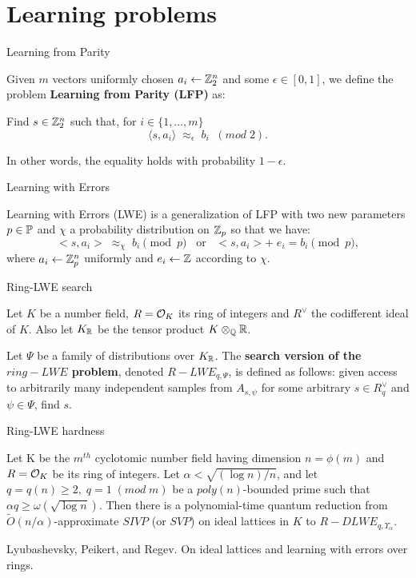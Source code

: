 \documentclass[notheorems, bigger]{beamer}
\begin{document}
\section{Learning problems}
\label{sec:org6cca3bc}
\begin{frame}[label={sec:org454f283}]{Learning from Parity}
\begin{text}
  Given $m$ vectors uniformly chosen  $a_i \gets \Z^n_2$ and some $\epsilon \in [0,1]$, we
  define the problem \textbf{Learning from Parity (LFP)} as:

  Find $s \in \Z^n_2$ such that, for $i \in \{1,\dots,m\}$
  $$ \langle{s, a_i}\rangle \; \approx_\epsilon \; b_i \;\; (mod\; 2). $$

  In other words, the equality holds with probability $1 - \epsilon$.
\end{text}
\end{frame}
\begin{frame}[label={sec:org1acc938}]{Learning with Errors}
\begin{text}
Learning with Errors (LWE) is a generalization of LFP  with two new parameters
$p \in \P$ and $\chi$ a probability distribution on $\Z_p$ so that we have:
\[
  <s, a_i> \; \approx_\chi \; b_i \pmod p \;\;\; \text{or} \;\;\; <s, a_i> + \; e_i =  b_i \pmod p ,
\]
where $a_i \gets \Z^n_p$ uniformly and $e_i \gets \Z$ according to $\chi$.
\end{text}
\end{frame}
\begin{frame}[label={sec:orgc575fd0}]{Ring-LWE search}
\begin{text}
  Let $K$ be a number field, $R = \Ok$ its ring of integers and $R^\vee$ the
  codifferent ideal of $K$. Also let $K_\R$ be the tensor product $K \otimes_\Q \R$.


  Let $\Psi$ be a family of distributions over $K_\R$. The \textbf{search version of the $ring-LWE$ problem}, denoted $R-LWE_{q,\Psi}$, is defined as follows: given access to arbitrarily many independent samples from $A_{s,\psi}$ for some arbitrary $s \in R_q^\vee$ and $\psi \in \Psi$, find $s$.
\end{text}
\end{frame}
\begin{frame}[label={sec:org91b339a}]{Ring-LWE hardness}
\begin{text}

  \begin{theorem}
    Let K be the $m^{th}$ cyclotomic number field having dimension $n = \phi(m)$ and $R =
    \Ok$ be its ring of integers. Let $\alpha < \sqrt{(\log{n})/n}$, and let $q = q(n)
    \geq 2, \; q = 1 \; (mod \; m)$ be a $poly(n)$-bounded prime such that $\alpha q \geq
    \omega(\sqrt{\log{n}})$. Then there is a polynomial-time quantum reduction from
    $\tilde{O}(n/\alpha)$-approximate $SIVP$ (or $SVP$) on ideal lattices in $K$ to
    $R-DLWE_{q,\Upsilon_\alpha}$.
  \end{theorem}


  \tiny Lyubashevsky, Peikert, and Regev. On ideal lattices and learning with errors over rings.
\end{text}
\end{frame}
\end{document}
